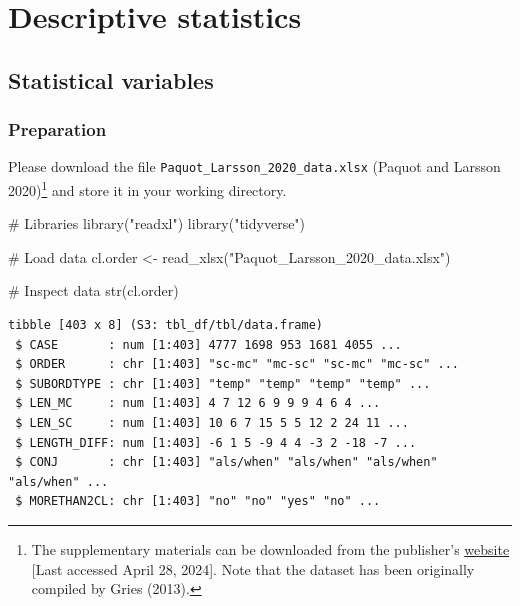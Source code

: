 \documentclass[
  11pt,
  letterpaper,
  DIV=11,
  numbers=noendperiod]{scrreprt}
\newenvironment{Shaded}{\begin{snugshade}}{\end{snugshade}}
\newcommand{\CommentTok}[1]{\textcolor[rgb]{0.37,0.37,0.37}{#1}}
\newcommand{\FunctionTok}[1]{\textcolor[rgb]{0.28,0.35,0.67}{#1}}
\newcommand{\NormalTok}[1]{\textcolor[rgb]{0.00,0.23,0.31}{#1}}
\newcommand{\OtherTok}[1]{\textcolor[rgb]{0.00,0.23,0.31}{#1}}
\newcommand{\StringTok}[1]{\textcolor[rgb]{0.13,0.47,0.30}{#1}}
\begin{document}
\part{Descriptive statistics}

\chapter{Statistical variables}\label{statistical-variables}

\section{Preparation}\label{preparation-2}

Please download the file \texttt{Paquot\_Larsson\_2020\_data.xlsx}
(Paquot and Larsson 2020)\footnote{The supplementary materials can be
  downloaded from the publisher's
  \href{https://link.springer.com/chapter/10.1007/978-3-030-46216-1_17}{website}
  {[}Last accessed April 28, 2024{]}. Note that the dataset has been
  originally compiled by Gries (2013).} and store it in your working
directory.

\begin{Shaded}
\begin{Highlighting}[]
\CommentTok{\# Libraries}
\FunctionTok{library}\NormalTok{(}\StringTok{"readxl"}\NormalTok{)}
\FunctionTok{library}\NormalTok{(}\StringTok{"tidyverse"}\NormalTok{)}

\CommentTok{\# Load data}
\NormalTok{cl.order }\OtherTok{\textless{}{-}} \FunctionTok{read\_xlsx}\NormalTok{(}\StringTok{"Paquot\_Larsson\_2020\_data.xlsx"}\NormalTok{)}

\CommentTok{\# Inspect data}
\FunctionTok{str}\NormalTok{(cl.order)}
\end{Highlighting}
\end{Shaded}

\begin{verbatim}
tibble [403 x 8] (S3: tbl_df/tbl/data.frame)
 $ CASE       : num [1:403] 4777 1698 953 1681 4055 ...
 $ ORDER      : chr [1:403] "sc-mc" "mc-sc" "sc-mc" "mc-sc" ...
 $ SUBORDTYPE : chr [1:403] "temp" "temp" "temp" "temp" ...
 $ LEN_MC     : num [1:403] 4 7 12 6 9 9 9 4 6 4 ...
 $ LEN_SC     : num [1:403] 10 6 7 15 5 5 12 2 24 11 ...
 $ LENGTH_DIFF: num [1:403] -6 1 5 -9 4 4 -3 2 -18 -7 ...
 $ CONJ       : chr [1:403] "als/when" "als/when" "als/when" "als/when" ...
 $ MORETHAN2CL: chr [1:403] "no" "no" "yes" "no" ...
\end{verbatim}
\end{document}
